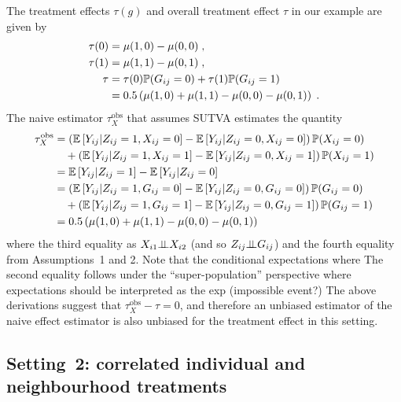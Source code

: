\documentclass[10pt]{article}
\begin{document}
The treatment effects $\tau(g)$ and overall treatment effect $\tau$ in our example are given by
\begin{align*}
\tau(0) &= \mu(1,0) - \mu(0,0) \;, \\
\tau(1) &= \mu(1,1) - \mu(0,1) \;, \\
\tau &= \tau(0)\P(G_{ij}=0) + \tau(1)\P(G_{ij}=1) \\
&= 0.5\left(\mu(1,0) + \mu(1,1) - \mu(0,0) - \mu(0,1)\right) \;.
\end{align*}
The naive estimator $\tau_{X}^\text{obs}$ that assumes SUTVA estimates the quantity
\begin{align*}
\tau_{X}^\text{obs} &= \left(\E\left[Y_{ij}|Z_{ij}=1,X_{ij}=0\right] - \E\left[Y_{ij}|Z_{ij}=0,X_{ij}=0\right]\right)\P(X_{ij}=0) \\
&\quad + \left(\E\left[Y_{ij}|Z_{ij}=1,X_{ij}=1\right] - \E\left[Y_{ij}|Z_{ij}=0,X_{ij}=1\right]\right)\P(X_{ij}=1) \\
&= \E\left[Y_{ij}|Z_{ij}=1\right] - \E\left[Y_{ij}|Z_{ij}=0\right] \\
&= \left(\E\left[Y_{ij}|Z_{ij}=1,G_{ij}=0\right] - \E\left[Y_{ij}|Z_{ij}=0,G_{ij}=0\right]\right)\P(G_{ij}=0) \\
&\quad + \left(\E\left[Y_{ij}|Z_{ij}=1,G_{ij}=1\right] - \E\left[Y_{ij}|Z_{ij}=0,G_{ij}=1\right]\right)\P(G_{ij}=1) \\
&= 0.5\left(\mu(1,0) + \mu(1,1) - \mu(0,0) - \mu(0,1)\right)
\end{align*}
where the third equality as $X_{i1}\condind X_{i2}$ (and so $Z_{ij}\condind G_{ij}$) and the fourth equality from Assumptions~1 and 2. Note that the conditional expectations where The second equality follows under the ``super-population'' perspective \parencite{Forastiere:2021} where expectations should be interpreted as the exp \todo (impossible event?) The above derivations suggest that $\tau_{X}^\text{obs}-\tau=0$, and therefore an unbiased estimator of the naive effect estimator is also unbiased for the treatment effect in this setting.

\subsection{Setting~2: correlated individual and neighbourhood treatments}
\end{document}
